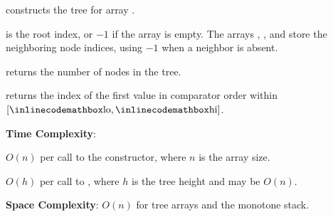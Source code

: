 \begin{compactitem}
  \item {} constructs the tree for array .
  \item {} is the root index, or $-1$ if the array is empty. The arrays , , and  store the neighboring node indices, using $-1$ when a neighbor is absent.
  \item {} returns the number of nodes in the tree.
  \item {} returns the index of the first value in comparator order within $[{\inlinecodemath{lo}}, {\inlinecodemath{hi}}]$.
\end{compactitem}

\textbf{Time Complexity}:
\begin{compactitem}
  \item $O(n)$ per call to the constructor, where $n$ is the array size.
  \item $O(h)$ per call to , where $h$ is the tree height and may be $O(n)$.
\end{compactitem}

\textbf{Space Complexity}: $O(n)$ for tree arrays and the monotone stack.

